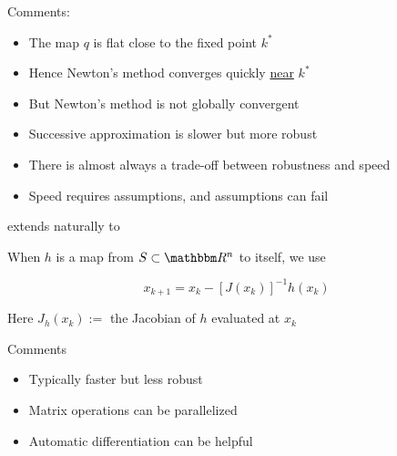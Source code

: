 \begin{frame}
    
    Comments:
    \begin{itemize}
        \item The map $q$ is flat close to the fixed point $k^*$
            \vspace{0.5em}
        \item Hence Newton's method converges quickly \underline{near} $k^*$
            \vspace{0.5em}
        \item But Newton's method is not globally convergent
            \vspace{0.5em}
        \item Successive approximation is slower but more robust
    \end{itemize}


    \begin{itemize}
        \item There is almost always a trade-off between robustness and speed
            \vspace{0.5em}
        \item Speed requires assumptions, and assumptions can fail
    \end{itemize}


\end{frame}


\begin{frame}
    
     extends naturally to 

            \vspace{0.5em}
    When $h$ is a map from $S \subset \RR^n$ to itself, we use

    \begin{equation*}
        x_{k+1} = x_k - [J(x_k)]^{-1} h(x_k)
    \end{equation*}

    Here $J_h(x_k) := $ the Jacobian of $h$ evaluated at $x_k$

    \vspace{1em}

    Comments
    \begin{itemize}
        \item Typically faster but less robust
            \vspace{0.5em}
        \item Matrix operations can be parallelized
            \vspace{0.5em}
        \item Automatic differentiation can be helpful
    \end{itemize}



\end{frame}


